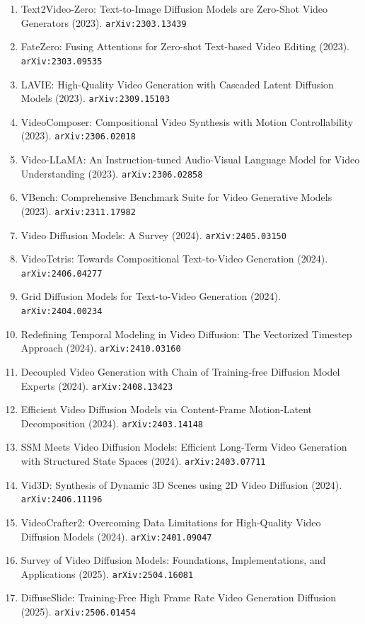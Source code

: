 \documentclass[11pt]{article}
\begin{document}
\begin{enumerate}
  \item Text2Video-Zero: Text-to-Image Diffusion Models are Zero-Shot Video
  Generators (2023). \texttt{arXiv:2303.13439}
  \item FateZero: Fusing Attentions for Zero-shot Text-based Video Editing (2023). \texttt{arXiv:2303.09535}
  \item LAVIE: High-Quality Video Generation with Cascaded Latent Diffusion
  Models (2023). \texttt{arXiv:2309.15103}
  \item VideoComposer: Compositional Video Synthesis with Motion Controllability (2023). \texttt{arXiv:2306.02018}
  \item Video-LLaMA: An Instruction-tuned Audio-Visual Language Model for Video
  Understanding (2023). \texttt{arXiv:2306.02858}
  \item VBench: Comprehensive Benchmark Suite for Video Generative Models (2023). \texttt{arXiv:2311.17982}
  \item Video Diffusion Models: A Survey (2024). \texttt{arXiv:2405.03150}
  \item VideoTetris: Towards Compositional Text-to-Video Generation (2024). \texttt{arXiv:2406.04277}
  \item Grid Diffusion Models for Text-to-Video Generation (2024). \texttt{arXiv:2404.00234}
  \item Redefining Temporal Modeling in Video Diffusion: The Vectorized Timestep
  Approach (2024). \texttt{arXiv:2410.03160}
  \item Decoupled Video Generation with Chain of Training-free Diffusion Model
  Experts (2024). \texttt{arXiv:2408.13423}
  \item Efficient Video Diffusion Models via Content-Frame Motion-Latent
  Decomposition (2024). \texttt{arXiv:2403.14148}
  \item SSM Meets Video Diffusion Models: Efficient Long-Term Video Generation
  with Structured State Spaces (2024). \texttt{arXiv:2403.07711}
  \item Vid3D: Synthesis of Dynamic 3D Scenes using 2D Video Diffusion (2024). \texttt{arXiv:2406.11196}
  \item VideoCrafter2: Overcoming Data Limitations for High-Quality Video
  Diffusion Models (2024). \texttt{arXiv:2401.09047}
  \item Survey of Video Diffusion Models: Foundations, Implementations, and Applications (2025). \texttt{arXiv:2504.16081}
  \item DiffuseSlide: Training-Free High Frame Rate Video Generation Diffusion (2025). \texttt{arXiv:2506.01454}

\end{enumerate}
\end{document}
